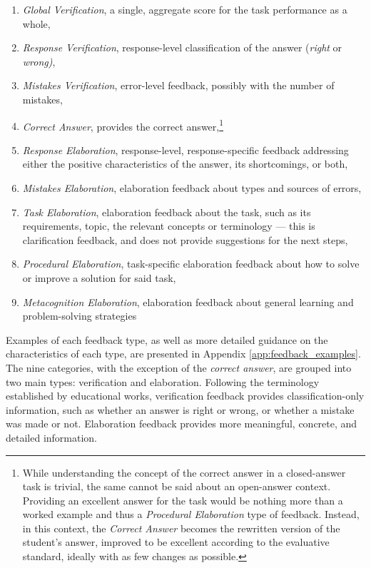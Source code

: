 \begin{enumerate}[itemsep=0.05em]
    \item \textit{Global Verification}, a single, aggregate score for the task performance as a whole,
    \item \textit{Response Verification}, response-level classification of the answer (\eg \textit{right} or \textit{wrong)},
    \item \textit{Mistakes Verification}, error-level feedback, possibly with the number of mistakes,
    \item \textit{Correct Answer}, provides the correct answer,\footnote{While understanding the concept of the correct answer in a closed-answer task is trivial, the same cannot be said about an open-answer context. Providing an excellent answer for the task would be nothing more than a worked example and thus a \textit{Procedural Elaboration} type of feedback. Instead, in this context, the \textit{Correct Answer} becomes the rewritten version of the student's answer, improved to be excellent according to the evaluative standard, ideally with as few changes as possible.}
    \item \textit{Response Elaboration}, response-level, response-specific feedback addressing either the positive characteristics of the answer, its shortcomings, or both,
    \item \textit{Mistakes Elaboration}, elaboration feedback about types and sources of errors,
    \item \textit{Task Elaboration}, elaboration feedback about the task, such as its requirements, topic, the relevant concepts or terminology --- this is clarification feedback, and does not provide suggestions for the next steps,
    \item \textit{Procedural Elaboration}, task-specific elaboration feedback about how to solve or improve a solution for said task,
    \item \textit{Metacognition Elaboration}, elaboration feedback about general learning and problem-solving strategies
\end{enumerate}

\noindent Examples of each feedback type, as well as more detailed guidance on the characteristics of each type,  are presented in Appendix \ref{app:feedback_examples}. The nine categories, with the exception of the \textit{correct answer}, are grouped into two main types: verification and elaboration. Following the terminology established by educational works, verification feedback provides classification-only information, such as whether an answer is right or wrong, or whether a mistake was made or not. 
Elaboration feedback provides more meaningful, concrete, and detailed information.

